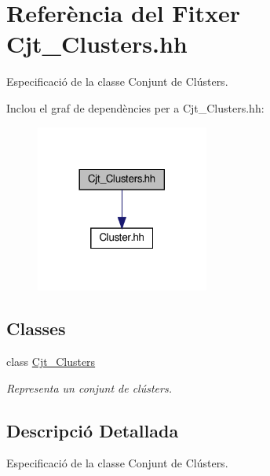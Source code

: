 \hypertarget{_cjt___clusters_8hh}{}\section{Referència del Fitxer Cjt\+\_\+\+Clusters.\+hh}
\label{_cjt___clusters_8hh}


Especificació de la classe Conjunt de Clústers.  


Inclou el graf de dependències per a Cjt\+\_\+\+Clusters.\+hh\+:\nopagebreak
\begin{figure}[H]
\begin{center}
\leavevmode
\includegraphics[width=161pt]{_cjt___clusters_8hh__incl}
\end{center}
\end{figure}
\subsection*{Classes}
\begin{DoxyCompactItemize}
\item 
class \hyperlink{class_cjt___clusters}{Cjt\+\_\+\+Clusters}
\begin{DoxyCompactList}\small\item\em Representa un conjunt de clústers. \end{DoxyCompactList}\end{DoxyCompactItemize}


\subsection{Descripció Detallada}
Especificació de la classe Conjunt de Clústers. 

